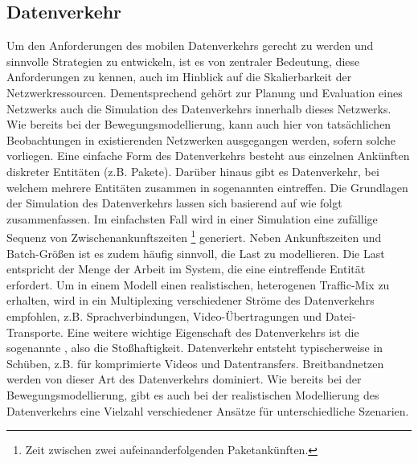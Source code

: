 \documentclass[12pt, a4paper]{article}
\begin{document}
\subsection{Datenverkehr}
\label{sec:traffic}

Um den Anforderungen des mobilen Datenverkehrs gerecht zu werden und sinnvolle Strategien zu entwickeln,
ist es von zentraler Bedeutung, diese Anforderungen zu kennen, auch im Hinblick auf die Skalierbarkeit der
Netzwerkressourcen. \cite{Oliveira2014} Dementsprechend gehört zur Planung und Evaluation eines Netzwerks 
auch die Simulation des Datenverkehrs innerhalb dieses Netzwerks. Wie bereits bei der Bewegungsmodellierung, 
kann auch hier von tatsächlichen Beobachtungen in existierenden Netzwerken ausgegangen werden, sofern solche vorliegen.\newline
Eine einfache Form des Datenverkehrs besteht aus einzelnen Ankünften diskreter Entitäten (z.B. Pakete).
Darüber hinaus gibt es Datenverkehr, bei welchem mehrere Entitäten zusammen in sogenannten  
eintreffen. \cite{Frost1994}
Die Grundlagen der Simulation des Datenverkehrs lassen sich basierend auf \cite{Frost1994} wie folgt zusammenfassen.
Im einfachsten Fall wird in einer Simulation eine zufällige Sequenz von Zwischenankunftszeiten \footnote{Zeit zwischen zwei 
aufeinanderfolgenden Paketankünften.} generiert. Neben Ankunftszeiten und Batch-Größen ist es zudem häufig sinnvoll,
die Last zu modellieren. Die Last entspricht der Menge der Arbeit im System, die eine eintreffende Entität
erfordert.
Um in einem Modell einen realistischen, heterogenen Traffic-Mix zu erhalten, wird in \cite{Frost1994} ein Multiplexing
verschiedener Ströme des Datenverkehrs empfohlen, z.B. Sprachverbindungen, Video-Übertragungen und Datei-Transporte.
Eine weitere wichtige Eigenschaft des Datenverkehrs ist die sogenannte , also die Stoßhaftigkeit.
Datenverkehr entsteht typischerweise in Schüben, z.B. für komprimierte Videos und Datentransfers. 
Breitbandnetzen werden von dieser Art des Datenverkehrs dominiert. \cite{Frost1994}
Wie bereits bei der Bewegungsmodellierung, gibt es auch bei der realistischen Modellierung des Datenverkehrs
eine Vielzahl verschiedener Ansätze für unterschiedliche Szenarien.
\end{document}
